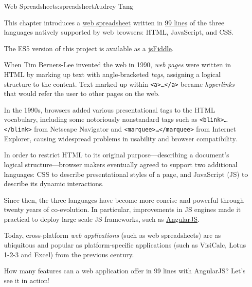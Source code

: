 \begin{aosachapter}{Web Spreadsheet}{s:spreadsheet}{Audrey Tang}

This chapter introduces a
\href{http://audreyt.github.io/500lines/spreadsheet/}{web spreadsheet}
written in
\href{https://github.com/audreyt/500lines/tree/master/spreadsheet/code}{99
lines} of the three languages natively supported by web browsers: HTML,
JavaScript, and CSS.

The ES5 version of this project is available as a
\href{http://jsfiddle.net/audreyt/LtDyP/}{jsFiddle}.

\label{introduction}

When Tim Berners-Lee invented the web in 1990, \emph{web pages} were
written in HTML by marking up text with angle-bracketed \emph{tags},
assigning a logical structure to the content. Text marked up within
\texttt{\textless{}a\textgreater{}\ldots{}\textless{}/a\textgreater{}}
became \emph{hyperlinks} that would refer the user to other pages on the
web.

In the 1990s, browsers added various presentational tags to the HTML
vocabulary, including some notoriously nonstandard tags such as
\texttt{\textless{}blink\textgreater{}\ldots{}\textless{}/blink\textgreater{}}
from Netscape Navigator and
\texttt{\textless{}marquee\textgreater{}\ldots{}\textless{}/marquee\textgreater{}}
from Internet Explorer, causing widespread problems in usability and
browser compatibility.

In order to restrict HTML to its original purpose---describing a
document's logical structure---browser makers eventually agreed to
support two additional languages: CSS to describe presentational styles
of a page, and JavaScript (JS) to describe its dynamic interactions.

Since then, the three languages have become more concise and powerful
through twenty years of co-evolution. In particular, improvements in JS
engines made it practical to deploy large-scale JS frameworks, such as
\href{http://angularjs.org/}{AngularJS}.

Today, cross-platform \emph{web applications} (such as web spreadsheets)
are as ubiquitous and popular as platform-specific applications (such as
VisiCalc, Lotus 1-2-3 and Excel) from the previous century.

How many features can a web application offer in 99 lines with
AngularJS? Let's see it in action!

\label{overview}


\end{aosachapter}
